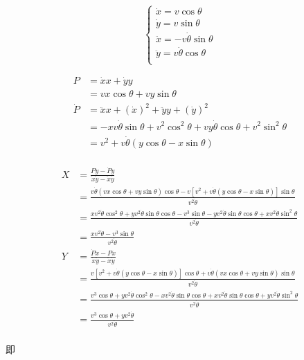 \documentclass{article}
\begin{document}
$$
\begin{cases}
	\dot{x}=v\cos \theta\\
	\dot{y}=v\sin \theta\\
	\ddot{x}=-v\dot{\theta}\sin \theta\\
	\ddot{y}=v\dot{\theta}\cos \theta\\
\end{cases}
$$

$$
\begin{aligned}
	P&=\dot{x}x+\dot{y}y\\
	&=vx\cos \theta +vy\sin \theta\\
	\dot{P}&=\ddot{x}x+\left( \dot{x} \right) ^2+\ddot{y}y+\left( \dot{y} \right) ^2\\
	&=-xv\dot{\theta}\sin \theta +v^2\cos ^2\theta +vy\dot{\theta}\cos \theta +v^2\sin ^2\theta\\
	&=v^2+v\dot{\theta}\left( y\cos \theta -x\sin \theta \right)\\
\end{aligned}
$$

$$
\begin{aligned}
	X&=\frac{P\ddot{y}-\dot{P}\dot{y}}{\dot{x}\ddot{y}-\ddot{x}\dot{y}}\\
	&=\frac{v\dot{\theta}\left( vx\cos \theta +vy\sin \theta \right) \cos \theta -v\left[ v^2+v\dot{\theta}\left( y\cos \theta -x\sin \theta \right) \right] \sin \theta}{v^2\dot{\theta}}\\
	&=\frac{xv^2\dot{\theta}\cos ^2\theta +yv^2\dot{\theta}\sin \theta \cos \theta -v^3\sin \theta -yv^2\dot{\theta}\sin \theta \cos \theta +xv^2\dot{\theta}\sin ^2\theta}{v^2\dot{\theta}}\\
	&=\frac{xv^2\dot{\theta}-v^3\sin \theta}{v^2\dot{\theta}}\\
	Y&=\frac{\dot{P}\dot{x}-P\ddot{x}}{\dot{x}\ddot{y}-\ddot{x}\dot{y}}\\
	&=\frac{v\left[ v^2+v\dot{\theta}\left( y\cos \theta -x\sin \theta \right) \right] \cos \theta +v\dot{\theta}\left( vx\cos \theta +vy\sin \theta \right) \sin \theta}{v^2\dot{\theta}}\\
	&=\frac{v^3\cos \theta +yv^2\dot{\theta}\cos ^2\theta -xv^2\dot{\theta}\sin \theta \cos \theta +xv^2\dot{\theta}\sin \theta \cos \theta +yv^2\dot{\theta}\sin ^2\theta}{v^2\dot{\theta}}\\
	&=\frac{v^3\cos \theta +yv^2\dot{\theta}}{v^2\dot{\theta}}\\
\end{aligned}
$$

即
\end{document}
